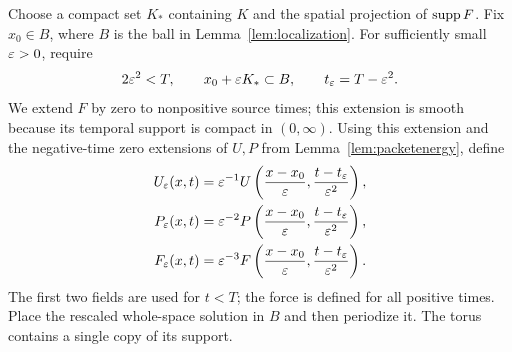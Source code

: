 Choose a compact set $K_*$ containing $K$ and the spatial projection of
$\operatorname{supp} F$. Fix $x_0\in B$, where $B$ is the ball in
Lemma~\ref{lem:localization}. For sufficiently small $\varepsilon>0$, require
\[
 2\varepsilon^2<T,\qquad x_0+\varepsilon K_*\subset B,
 \qquad t_\varepsilon=T-\varepsilon^2.
\]
We extend $F$ by zero to nonpositive source times; this extension is smooth
because its temporal support is compact in $(0,\infty)$. Using this
extension and the negative-time zero extensions of $U,P$ from
Lemma~\ref{lem:packetenergy}, define
\begin{align}
 U_\varepsilon(x,t)&=\varepsilon^{-1}U\left(\frac{x-x_0}{\varepsilon},
                              \frac{t-t_\varepsilon}{\varepsilon^2}\right),\nonumber\\
 P_\varepsilon(x,t)&=\varepsilon^{-2}P\left(\frac{x-x_0}{\varepsilon},
                              \frac{t-t_\varepsilon}{\varepsilon^2}\right),\label{eq:scaling}\\
 F_\varepsilon(x,t)&=\varepsilon^{-3}F\left(\frac{x-x_0}{\varepsilon},
                              \frac{t-t_\varepsilon}{\varepsilon^2}\right).\nonumber
\end{align}
The first two fields are used for $t<T$; the force is defined for all positive times. Place the rescaled whole-space solution in $B$ and then periodize it. The torus contains a single copy of its support.

